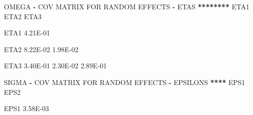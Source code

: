 \documentclass[
  11pt,
  krantz2,
  a4paper]{krantz}
\newenvironment{Shaded}{\begin{snugshade}}{\end{snugshade}}
\newcommand{\ErrorTok}[1]{\textcolor[rgb]{0.64,0.00,0.00}{\textbf{#1}}}
\newcommand{\FloatTok}[1]{\textcolor[rgb]{0.00,0.00,0.81}{#1}}
\newcommand{\NormalTok}[1]{#1}
\newcommand{\OperatorTok}[1]{\textcolor[rgb]{0.81,0.36,0.00}{\textbf{#1}}}
\newcommand{\StringTok}[1]{\textcolor[rgb]{0.31,0.60,0.02}{#1}}
\theoremstyle{definition}
\theoremstyle{definition}
\theoremstyle{definition}
\theoremstyle{remark}
\begin{document}
\begin{Shaded}
\begin{Highlighting}[]
\NormalTok{OMEGA }\OperatorTok{{-}}\StringTok{ }\NormalTok{COV MATRIX FOR RANDOM EFFECTS }\OperatorTok{{-}}\StringTok{ }\NormalTok{ETAS  }\OperatorTok{**}\ErrorTok{******}\StringTok{                                                 }
\StringTok{                                                                                                       }
\StringTok{                                                                                                       }
\StringTok{        }\NormalTok{ETA1      ETA2      ETA3                                                                       }
                                                                                                       
\NormalTok{ETA1    }\FloatTok{4.21E{-}01}                                                                                       
                                                                                                       
\NormalTok{ETA2    }\FloatTok{8.22E{-}02}  \FloatTok{1.98E{-}02}                                                                             
                                                                                                       
\NormalTok{ETA3    }\FloatTok{3.40E{-}01}  \FloatTok{2.30E{-}02}  \FloatTok{2.89E{-}01}                                                                   
                                                                                                       
                                                                                                       
                                                                                                       
\NormalTok{SIGMA }\OperatorTok{{-}}\StringTok{ }\NormalTok{COV MATRIX FOR RANDOM EFFECTS }\OperatorTok{{-}}\StringTok{ }\NormalTok{EPSILONS  }\OperatorTok{**}\ErrorTok{**}\StringTok{                                                 }
\StringTok{                                                                                                       }
\StringTok{                                                                                                       }
\StringTok{        }\NormalTok{EPS1      EPS2                                                                                 }
                                                                                                       
\NormalTok{EPS1    }\FloatTok{3.58E{-}03}                                                                                       
                                                                                                       

\end{Highlighting}
\end{Shaded}
\end{document}
